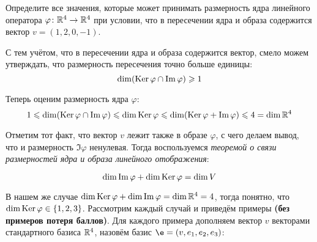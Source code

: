 \begin{condition}
    Определите все значения, которые может принимать размерность ядра линейного оператора $\varphi \colon \mathbb{R}^4 \to \mathbb{R}^4$ при условии, что в пересечении ядра и образа содержится вектор $v = (1, 2, 0, -1)$.
\end{condition}
С тем учётом, что в пересечении ядра и образа содержится вектор, смело можем утверждать, что размерность пересечения точно больше единицы:
\[
    \dim (\operatorname{Ker} \varphi \cap \Im \varphi) \geqslant 1
\]

Теперь оценим размерность ядра $\varphi$:
\[
    1 \leqslant \dim(\operatorname{Ker} \varphi \cap \Im \varphi) \leqslant \dim \operatorname{Ker} \varphi \leqslant \dim(\operatorname{Ker} \varphi + \Im \varphi) \leqslant 4 = \dim \mathbb{R}^4
\]

Отметим тот факт, что вектор $v$ лежит также в образе $\varphi$, с чего делаем вывод, что и размерность $\Im \varphi$ ненулевая. Тогда воспользуемся \textit{теоремой о связи размерностей ядра и образа линейного отображения}:
\begin{theorem}
    \[
        \dim \Im \varphi + \dim \operatorname{Ker} \varphi = \dim V
    \]
\end{theorem}

В нашем же случае $\dim \operatorname{Ker} \varphi + \dim \Im \varphi = \dim \mathbb{R}^4 = 4$, тогда понятно, что $\dim \operatorname{Ker} \varphi \in \{1, 2, 3\}$. Рассмотрим каждый случай и приведём примеры \textbf{(без примеров потеря баллов)}. Для каждого примера дополняем вектор $v$ векторами стандартного базиса $\mathbb{R}^4$, назовём базис $\e = (v, e_1, e_2, e_3)$:

